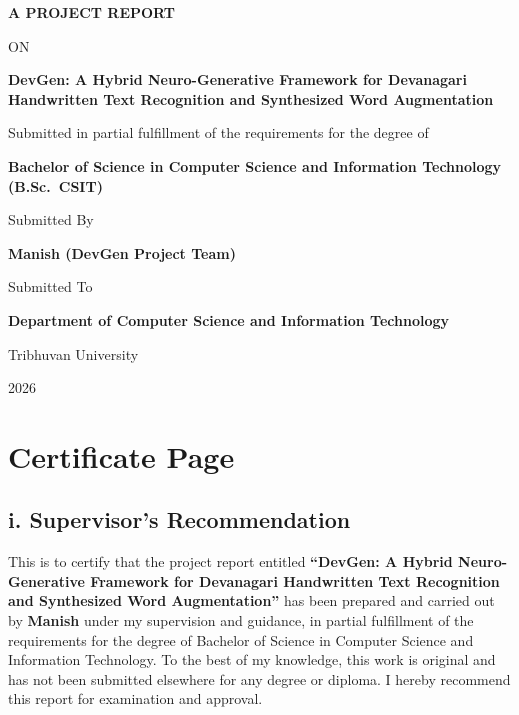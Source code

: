 \documentclass[12pt,a4paper]{report}
\begin{document}
\begin{titlepage}
\centering
{\Large\bfseries A PROJECT REPORT\par}
\vspace{0.4cm}
{\normalsize ON\par}
\vspace{0.6cm}
{\LARGE\bfseries DevGen: A Hybrid Neuro-Generative Framework for Devanagari Handwritten Text Recognition and Synthesized Word Augmentation\par}
\vspace{1.5cm}
{\normalsize Submitted in partial fulfillment of the requirements for the degree of\par}
\vspace{0.3cm}
{\large\bfseries Bachelor of Science in Computer Science and Information Technology (B.Sc.\ CSIT)\par}
\vspace{1.5cm}
{\normalsize Submitted By\par}
{\large\bfseries Manish (DevGen Project Team)\par}
\vspace{1.2cm}
{\normalsize Submitted To\par}
{\large\bfseries Department of Computer Science and Information Technology\par}
{\normalsize Tribhuvan University\par}
\vfill
{\normalsize 2026\par}
\end{titlepage}


\chapter*{Certificate Page}

\section*{i. Supervisor's Recommendation}
This is to certify that the project report entitled \textbf{``DevGen: A Hybrid Neuro-Generative Framework for Devanagari Handwritten Text Recognition and Synthesized Word Augmentation''} has been prepared and carried out by \textbf{Manish} under my supervision and guidance, in partial fulfillment of the requirements for the degree of Bachelor of Science in Computer Science and Information Technology. To the best of my knowledge, this work is original and has not been submitted elsewhere for any degree or diploma. I hereby recommend this report for examination and approval.
\end{document}
